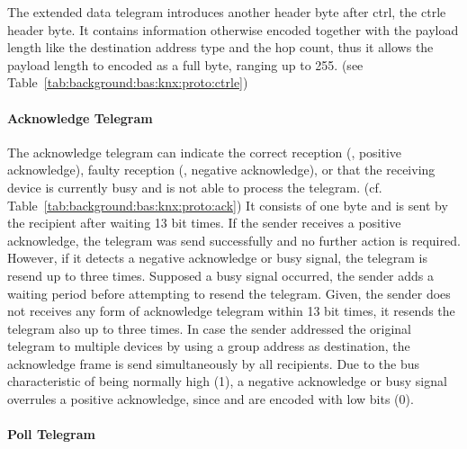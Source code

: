 The extended data telegram introduces another header byte after \gls{ctrl}, the \gls{ctrle} header byte. It contains information otherwise encoded together with the payload length like the destination address type and the hop count, thus it allows the payload length to encoded as a full byte, ranging up to 255. (see Table~\ref{tab:background:bas:knx:proto:ctrle})

\paragraph{Acknowledge Telegram}
\label{sec:background:bas:knx:proto:ack}

The acknowledge telegram can indicate the correct reception (, positive acknowledge), faulty reception (, negative acknowledge), or that the receiving device is currently busy and is not able to process the telegram. (cf. Table~\ref{tab:background:bas:knx:proto:ack})
It consists of one byte and is sent by the recipient after waiting 13 bit times.
If the sender receives a positive acknowledge, the telegram was send successfully and no further action is required. However, if it detects a negative acknowledge or busy signal, the telegram is resend up to three times.
Supposed a busy signal occurred, the sender adds a waiting period before attempting to resend the telegram.
Given, the sender does not receives any form of acknowledge telegram within 13 bit times, it resends the telegram also up to three times.
In case the sender addressed the original telegram to multiple devices by using a group address as destination, the acknowledge frame is send simultaneously by all recipients. Due to the bus characteristic of being normally high (1), a negative acknowledge or busy signal overrules a positive acknowledge, since  and  are encoded with low bits (0). \parencite{Merz2009,Sokollik2017}

\paragraph{Poll Telegram}
\label{sec:background:bas:knx:proto:poll}

